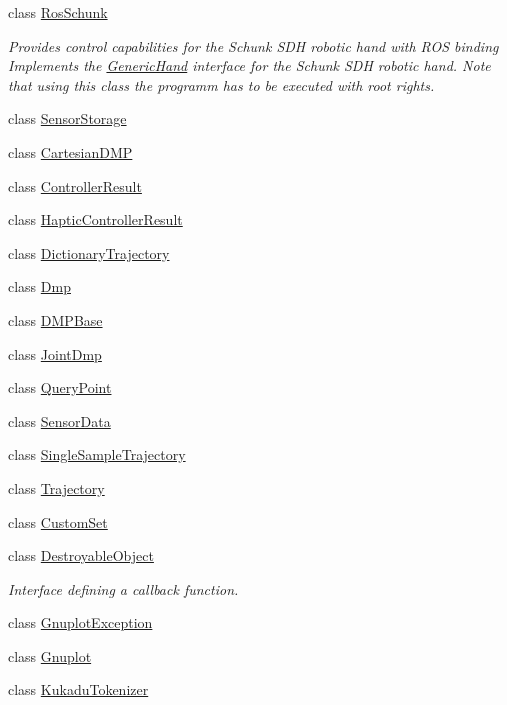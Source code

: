 \begin{DoxyCompactItemize}
class \hyperlink{classkukadu_1_1RosSchunk}{Ros\-Schunk}
\begin{DoxyCompactList}\small\item\em Provides control capabilities for the Schunk S\-D\-H robotic hand with R\-O\-S binding Implements the \hyperlink{classkukadu_1_1GenericHand}{Generic\-Hand} interface for the Schunk S\-D\-H robotic hand. Note that using this class the programm has to be executed with root rights. \end{DoxyCompactList}\item 
class \hyperlink{classkukadu_1_1SensorStorage}{Sensor\-Storage}
\item 
class \hyperlink{classkukadu_1_1CartesianDMP}{Cartesian\-D\-M\-P}
\item 
class \hyperlink{classkukadu_1_1ControllerResult}{Controller\-Result}
\item 
class \hyperlink{classkukadu_1_1HapticControllerResult}{Haptic\-Controller\-Result}
\item 
class \hyperlink{classkukadu_1_1DictionaryTrajectory}{Dictionary\-Trajectory}
\item 
class \hyperlink{classkukadu_1_1Dmp}{Dmp}
\item 
class \hyperlink{classkukadu_1_1DMPBase}{D\-M\-P\-Base}
\item 
class \hyperlink{classkukadu_1_1JointDmp}{Joint\-Dmp}
\item 
class \hyperlink{classkukadu_1_1QueryPoint}{Query\-Point}
\item 
class \hyperlink{classkukadu_1_1SensorData}{Sensor\-Data}
\item 
class \hyperlink{classkukadu_1_1SingleSampleTrajectory}{Single\-Sample\-Trajectory}
\item 
class \hyperlink{classkukadu_1_1Trajectory}{Trajectory}
\item 
class \hyperlink{classkukadu_1_1CustomSet}{Custom\-Set}
\item 
class \hyperlink{classkukadu_1_1DestroyableObject}{Destroyable\-Object}
\begin{DoxyCompactList}\small\item\em Interface defining a callback function. \end{DoxyCompactList}\item 
class \hyperlink{classkukadu_1_1GnuplotException}{Gnuplot\-Exception}
\item 
class \hyperlink{classkukadu_1_1Gnuplot}{Gnuplot}
\item 
class \hyperlink{classkukadu_1_1KukaduTokenizer}{Kukadu\-Tokenizer}

\end{DoxyCompactItemize}
